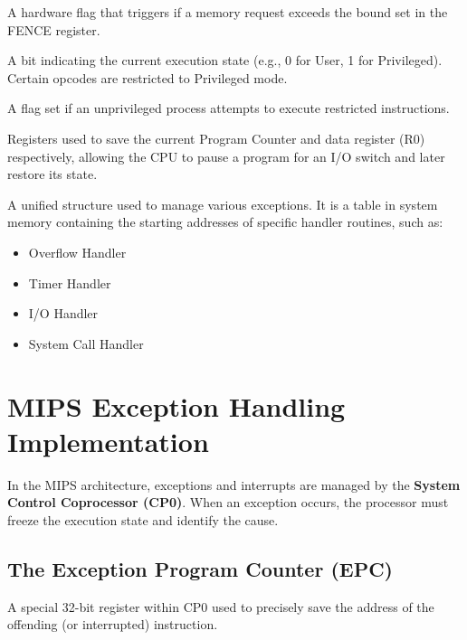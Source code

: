 \begin{vocabulary}
A hardware flag that triggers if a memory request exceeds the bound set in the FENCE register.
\end{vocabulary}

\begin{vocabulary}
A bit indicating the current execution state (e.g., 0 for User, 1 for Privileged). Certain opcodes are restricted to Privileged mode.
\end{vocabulary}

\begin{vocabulary}
A flag set if an unprivileged process attempts to execute restricted instructions.
\end{vocabulary}

\begin{vocabulary}
Registers used to save the current Program Counter and data register (R0) respectively, allowing the CPU to pause a program for an I/O switch and later restore its state.
\end{vocabulary}

\begin{definition}
A unified structure used to manage various exceptions. It is a table in system memory containing the starting addresses of specific handler routines, such as:
\begin{itemize}
    \item Overflow Handler
    \item Timer Handler
    \item I/O Handler
    \item System Call Handler
\end{itemize}
\end{definition}

\section{MIPS Exception Handling Implementation}
In the MIPS architecture, exceptions and interrupts are managed by the \textbf{System Control Coprocessor (CP0)}. When an exception occurs, the processor must freeze the execution state and identify the cause.

\subsection{The Exception Program Counter (EPC)}
\begin{definition}
A special 32-bit register within CP0 used to precisely save the address of the offending (or interrupted) instruction.
\end{definition}

